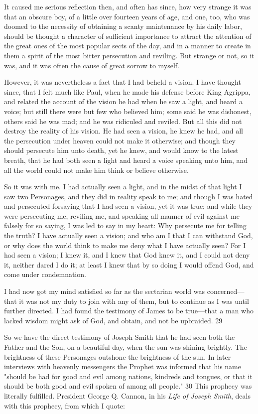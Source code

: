 It caused me serious reflection then, and often has since, how very strange it was that an
obscure boy, of a little over fourteen years of age, and one, too, who was doomed to the
necessity of obtaining a scanty maintenance by his daily labor, should be thought a character
of sufficient importance to attract the attention of the great ones of the most popular sects of
the day, and in a manner to create in them a spirit of the most bitter persecution and reviling.
But strange or not, so it was, and it was often the cause of great sorrow to myself.

However, it was nevertheless a fact that I had beheld a vision. I have thought since, that I felt
much like Paul, when he made his defense before King Agrippa, and related the account of
the vision he had when he saw a light, and heard a voice; but still there were but few who
believed him; some said he was dishonest, others said he was mad; and he was ridiculed and
reviled. But all this did not destroy the reality of his vision. He had seen a vision, he knew he
had, and all the persecution under heaven could not make it otherwise; and though they
should persecute him unto death, yet he knew, and would know to the latest breath, that he
had both seen a light and heard a voice speaking unto him, and all the world could not make
him think or believe otherwise.

So it was with me. I had actually seen a light, and in the midst of that light I saw two
Personages, and they did in reality speak to me; and though I was hated and persecuted forsaying that I had seen a vision, yet it was true; and while they were persecuting me, reviling
me, and speaking all manner of evil against me falsely for so saying, I was led to say in my
heart: Why persecute me for telling the truth? I have actually seen a vision; and who am I
that I can withstand God, or why does the world think to make me deny what I have actually
seen? For I had seen a vision; I knew it, and I knew that God knew it, and I could not deny it,
neither dared I do it; at least I knew that by so doing I would offend God, and come under
condemnation.

I had now got my mind satisfied so far as the sectarian world was concerned—that it was not
my duty to join with any of them, but to continue as I was until further directed. I had found
the testimony of James to be true—that a man who lacked wisdom might ask of God, and
obtain, and not be upbraided. 29

So we have the direct testimony of Joseph Smith that he had seen both the Father and the
Son, on a beautiful day, when the sun was shining brightly. The brightness of these
Personages outshone the brightness of the sun. In later interviews with heavenly messengers
the Prophet was informed that his name "should be had for good and evil among nations,
kindreds and tongues, or that it should be both good and evil spoken of among all people." 30
This prophecy was literally fulfilled. President George Q. Cannon, in his \textit{Life of Joseph
Smith}, deals with this prophecy, from which I quote:

